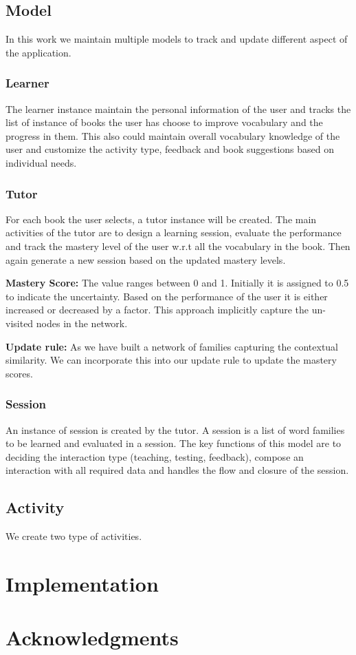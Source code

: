 \documentclass[11pt,a4paper]{article}
\begin{document}
\subsection{Model}
In this work we maintain multiple models to track and update different aspect
of the application.

\subsubsection{Learner}
The learner instance maintain the personal information of the user and tracks
the list of instance of books the user has choose to improve vocabulary and the
progress in them. This also could maintain overall vocabulary knowledge of
the user and customize the activity type, feedback and book suggestions based
on individual needs.

\subsubsection{Tutor}
For each book the user selects, a tutor instance will be created. The main
activities of the tutor are to design a learning session, evaluate the
performance and track the mastery level of the user w.r.t all the vocabulary
in the book. Then again generate a new session based on the updated mastery
levels.

\textbf{Mastery Score:} The value ranges between 0 and 1. Initially it is
assigned to 0.5 to indicate the uncertainty. Based on the performance of the
user it is either increased or decreased by a factor. This approach implicitly
capture the un-visited nodes in the network.

\textbf{Update rule:} As we have built a network of families capturing the
contextual similarity. We can incorporate this into our update rule to update
the mastery scores.

\subsubsection{Session}
An instance of session is created by the tutor. A session is a list of word
families to be learned and evaluated in a session. The key functions of this
model are to deciding the interaction type (teaching, testing, feedback), 
compose an interaction with all required data and handles the flow and closure
of the session.

\subsection{Activity}
We create two type of activities. 

\section{Implementation}

\section*{Acknowledgments}

%
%


\end{document}
